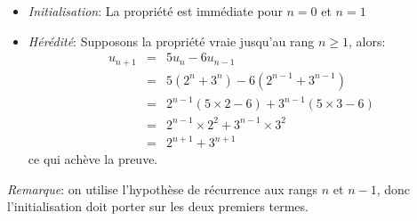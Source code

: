 \begin{itemize}
  \item \textit{Initialisation}: La propriété est immédiate pour $n=0$ et $n=1$
  \item \textit{Hérédité}: Supposons la propriété vraie jusqu'au rang $n\geq 1$, alors:
  \begin{eqnarray*}
    u_{n+1} &=& 5u_n - 6u_{n-1} \\
    &=& 5(2^n+3^n)-6(2^{n-1}+3^{n-1}) \\
    &=& 2^{n-1}(5\times 2 -6)+3^{n-1}(5\times 3-6) \\
    &=& 2^{n-1}\times2^2 + 3^{n-1}\times 3^2 \\
    &=& 2^{n+1}+3^{n+1}
  \end{eqnarray*}
  ce qui achève la preuve.\\
\end{itemize}

\textit{Remarque}: on utilise l’hypothèse de récurrence aux rangs $n$ et $n-1$, donc l'initialisation doit porter sur les deux premiers termes.
